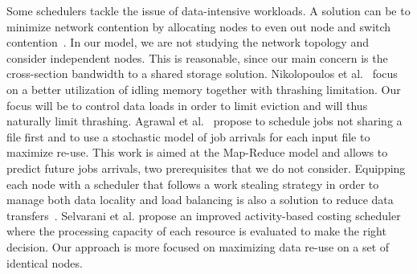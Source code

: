 \documentclass[sigconf,review,anonymous]{acmart}
\begin{document}
Some schedulers tackle the issue of data-intensive workloads. 
A solution can be to minimize network contention by allocating nodes to even out node and
switch contention~\cite{minimize_network_contention}. 
In our model, we are not studying the network topology and consider independent nodes.
This is reasonable, since our main concern is the cross-section bandwidth to a shared storage solution.
%
Nikolopoulos et al.~\cite{Nikolopoulos2003AdaptiveSU}
focus on a better utilization of idling memory together with 
thrashing limitation.
Our focus will be to control data loads in order to limit eviction
and will thus naturally limit thrashing. 
%
Agrawal et al.~\cite{Scheduling_Shared_Scans_of_Large_Data_Files}
propose to schedule jobs not sharing a file first
and to use a stochastic model of job arrivals for each input file to maximize re-use.
This work is aimed at the Map-Reduce model and allows to predict future jobs arrivals, two prerequisites that we do not consider. 
%
Equipping each node with a scheduler that follows a work
stealing strategy in order to manage both data locality 
and load balancing is also a solution to reduce data transfers~\cite{Optimizing_load_balancing_and_data_locality_with_data_aware_scheduling}. 
%
Selvarani et al. propose an improved activity-based costing scheduler~\cite{Improved_cost_based_algorithm}
where the processing capacity of each resource is evaluated to make the right decision.
Our approach is more focused on maximizing data re-use on a 
set of identical nodes.

\end{document}
